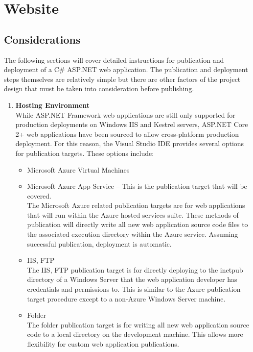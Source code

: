 
\section{Website}
\subsection{Considerations}

\tab The following sections will cover detailed instructions for publication and deployment of a C\# ASP.NET web application. The publication and deployment steps themselves are relatively simple but there are other factors of the project design that must be taken into consideration before publishing.  

\begin{enumerate}
    \item \textbf{Hosting Environment}\\

    \tab While ASP.NET Framework web applications are still only supported for production deployments on Windows IIS and Kestrel servers, ASP.NET Core 2+ web applications have been sourced to allow cross-platform production deployment. For this reason, the Visual Studio IDE provides several options for publication targets. These options include:

    \begin{itemize}
        \item Microsoft Azure Virtual Machines
        \item Microsoft Azure App Service -- This is the publication target that will be covered.\\
        
        \tab The Microsoft Azure related publication targets are for web applications that will run within the Azure hosted services suite. These methods of publication will directly write all new web application source code files to the associated execution directory within the Azure service.  Assuming successful publication, deployment is automatic.\\
        
        \item IIS, FTP\\
        
        \tab The IIS, FTP publication target is for directly deploying to the inetpub directory of a Windows Server that the web application developer has credentials and permissions to.  This is similar to the Azure publication target procedure except to a non-Azure Windows Server machine.\\
        
        \item Folder\\
        
        \tab The folder publication target is for writing all new web application source code to a local directory on the development machine. This allows more flexibility for custom web application publications.
    \end{itemize}
\end{enumerate}

